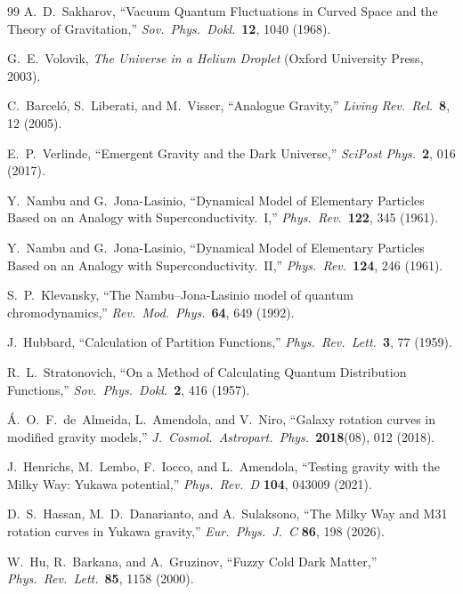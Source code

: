 \documentclass[11pt,a4paper]{article}
\begin{document}
\begin{thebibliography}{99}
A.~D.~Sakharov,
``Vacuum Quantum Fluctuations in Curved Space and the Theory of
Gravitation,''
\textit{Sov.\ Phys.\ Dokl.}\ \textbf{12}, 1040 (1968).

G.~E.~Volovik,
\textit{The Universe in a Helium Droplet}
(Oxford University Press, 2003).

C.~Barcel\'{o}, S.~Liberati, and M.~Visser,
``Analogue Gravity,''
\textit{Living Rev.\ Rel.}\ \textbf{8}, 12 (2005).

E.~P.~Verlinde,
``Emergent Gravity and the Dark Universe,''
\textit{SciPost Phys.}\ \textbf{2}, 016 (2017).

Y.~Nambu and G.~Jona-Lasinio,
``Dynamical Model of Elementary Particles Based on an Analogy
with Superconductivity.\ I,''
\textit{Phys.\ Rev.}\ \textbf{122}, 345 (1961).

Y.~Nambu and G.~Jona-Lasinio,
``Dynamical Model of Elementary Particles Based on an Analogy
with Superconductivity.\ II,''
\textit{Phys.\ Rev.}\ \textbf{124}, 246 (1961).

S.~P.~Klevansky,
``The Nambu--Jona-Lasinio model of quantum chromodynamics,''
\textit{Rev.\ Mod.\ Phys.}\ \textbf{64}, 649 (1992).

J.~Hubbard,
``Calculation of Partition Functions,''
\textit{Phys.\ Rev.\ Lett.}\ \textbf{3}, 77 (1959).

R.~L.~Stratonovich,
``On a Method of Calculating Quantum Distribution Functions,''
\textit{Sov.\ Phys.\ Dokl.}\ \textbf{2}, 416 (1957).

\'{A}.~O.~F.~de~Almeida, L.~Amendola, and V.~Niro,
``Galaxy rotation curves in modified gravity models,''
\textit{J.\ Cosmol.\ Astropart.\ Phys.}\ \textbf{2018}(08), 012 (2018).

J.~Henrichs, M.~Lembo, F.~Iocco, and L.~Amendola,
``Testing gravity with the Milky Way: Yukawa potential,''
\textit{Phys.\ Rev.\ D} \textbf{104}, 043009 (2021).

D.~S.~Hassan, M.~D.~Danarianto, and A.~Sulaksono,
``The Milky Way and M31 rotation curves in Yukawa gravity,''
\textit{Eur.\ Phys.\ J.\ C} \textbf{86}, 198 (2026).

W.~Hu, R.~Barkana, and A.~Gruzinov,
``Fuzzy Cold Dark Matter,''
\textit{Phys.\ Rev.\ Lett.}\ \textbf{85}, 1158 (2000).


\end{thebibliography}
\end{document}
